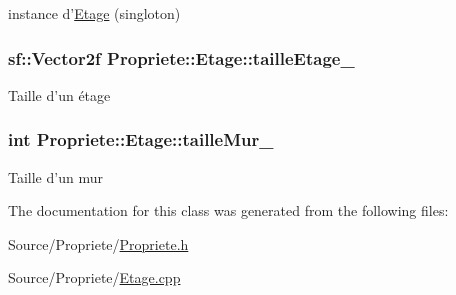 instance d'\hyperlink{classPropriete_1_1Etage}{Etage} (singloton) \hypertarget{classPropriete_1_1Etage_ae44d4fd0e1a43d668f5614567ee6482b}{
\subsubsection[{taille\-Etage\-\_\-}]{\setlength{\rightskip}{0pt plus 5cm}sf\-::\-Vector2f Propriete\-::\-Etage\-::taille\-Etage\-\_\-\hspace{0.3cm}{\ttfamily [private]}}}\label{classPropriete_1_1Etage_ae44d4fd0e1a43d668f5614567ee6482b}
Taille d'un étage \hypertarget{classPropriete_1_1Etage_a110762d117446f53e2738fc93f0fba0c}{
\subsubsection[{taille\-Mur\-\_\-}]{\setlength{\rightskip}{0pt plus 5cm}int Propriete\-::\-Etage\-::taille\-Mur\-\_\-\hspace{0.3cm}{\ttfamily [private]}}}\label{classPropriete_1_1Etage_a110762d117446f53e2738fc93f0fba0c}
Taille d'un mur 

The documentation for this class was generated from the following files\-:\begin{DoxyCompactItemize}
\item 
Source/\-Propriete/\hyperlink{Propriete_8h}{Propriete.\-h}\item 
Source/\-Propriete/\hyperlink{Propriete_2Etage_8cpp}{Etage.\-cpp}\end{DoxyCompactItemize}
